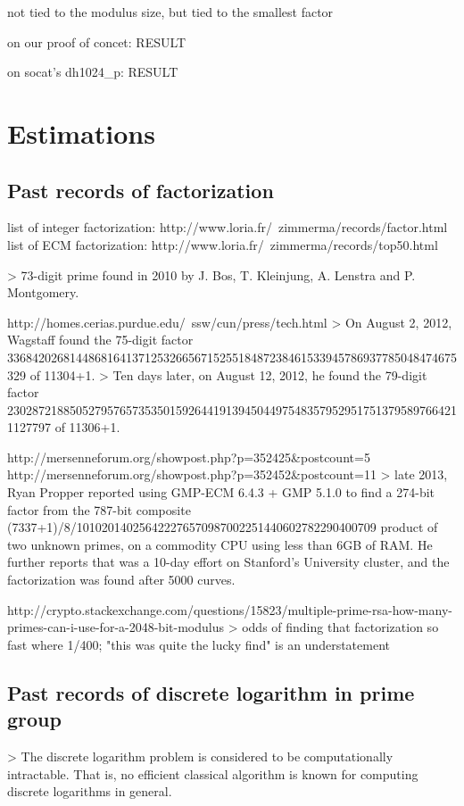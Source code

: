 \documentclass[a4paper,11pt]{article}
\begin{document}
not tied to the modulus size, but tied to the smallest factor

on our proof of concet: RESULT

on socat's dh1024_p: RESULT

\section{Estimations}

\subsection{Past records of factorization}

list of integer factorization: http://www.loria.fr/~zimmerma/records/factor.html
list of ECM factorization: http://www.loria.fr/~zimmerma/records/top50.html

> 73-digit prime found in 2010 by J. Bos, T. Kleinjung, A. Lenstra and P. Montgomery.
 
http://homes.cerias.purdue.edu/~ssw/cun/press/tech.html
>  On August 2, 2012, Wagstaff found the 75-digit factor
336842026814486816413712532665671525518487238461533945786937785048474675329
of 11304+1.
> Ten days later, on August 12, 2012, he found the 79-digit factor
2302872188505279576573535015926441913945044975483579529517513795897664211127797
of 11306+1. 

http://mersenneforum.org/showpost.php?p=352425&postcount=5
http://mersenneforum.org/showpost.php?p=352452&postcount=11
> late 2013, Ryan Propper reported using GMP-ECM 6.4.3 + GMP 5.1.0 to find a 274-bit factor from the 787-bit composite (7337+1)/8/101020140256422276570987002251440602782290400709 product of two unknown primes, on a commodity CPU using less than 6GB of RAM. He further reports that was a 10-day effort on Stanford's University cluster, and the factorization was found after 5000 curves.

http://crypto.stackexchange.com/questions/15823/multiple-prime-rsa-how-many-primes-can-i-use-for-a-2048-bit-modulus
> odds of finding that factorization so fast where 1/400; "this was quite the lucky find" is an understatement

\subsection{Past records of discrete logarithm in prime group}

> The discrete logarithm problem is considered to be computationally intractable. That is, no efficient classical algorithm is known for computing discrete logarithms in general.
\end{document}

